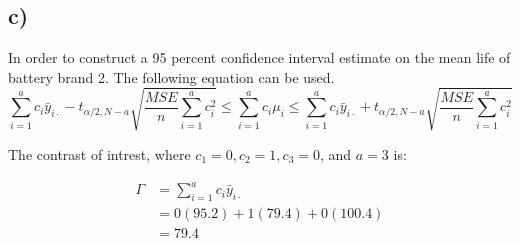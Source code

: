 \documentclass{article}
\begin{document}
\clearpage
\subsection*{c)}
In order to construct a 95 percent confidence interval estimate on
the mean life of battery brand 2. The following equation can be used. \\
\begin{equation*}
    \sum_{i=1}^{a} c_i \bar{y}_{i \cdot} - t_{\alpha/2, N-a} \sqrt{\frac{MSE}{n} \sum_{i=1}^{a} c_i^2}
    \leq \sum_{i=1}^{a} c_i \mu_i \leq
    \sum_{i=1}^{a} c_i \bar{y}_{i \cdot} + t_{\alpha/2, N-a} \sqrt{\frac{MSE}{n} \sum_{i=1}^{a} c_i^2}
\end{equation*}
\begin{flushleft}
The contrast of intrest, where $c_1 = 0, c_2 = 1, c_3 = 0$, and $a = 3$ is:
\end{flushleft}
\begin{align*}
    \Gamma &=  \sum_{i=1}^{a} c_i \bar{y}_{i \cdot} \\
                &= 0(95.2) + 1(79.4) + 0(100.4) \\
                &= 79.4 
    \end{align*}
\end{document}
